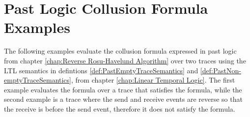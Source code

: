\chapter{Past Logic Collusion Formula Examples}
\label{app:PastLogicCollusionFormulaExamples}

The following examples evaluate the collusion formula expressed in past logic from chapter \ref{chap:Reverse Rosu-Havelund Algorithm} over two traces using the LTL semantics in defintions \ref{def:PastEmptyTraceSemantics} and \ref{def:PastNon-emptyTraceSemantics}, from chapter \ref{chap:Linear Temporal Logic}.  The first example evaluates the formula over a trace that satisfies the formula, while the second example is a trace where the send and receive events are reverse so that the receive is before the send event, therefore it does not satisfy the formula. 

